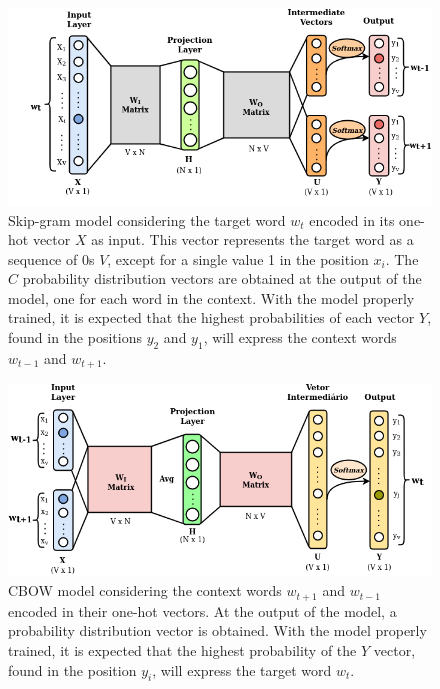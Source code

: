 \documentclass{ieeeaccess}
\begin{document}

\begin{figure}[h]
	\centering
	\includegraphics[width=.8\linewidth]{../minicurso/skipgram.png}
	\caption{Skip-gram model considering the target word $ w_t $ encoded in its one-hot vector $ X $ as input. This vector represents the target word as a  sequence of 0s $ V $, except for a single value 1 in the position $ x_i $.   The $C$ probability distribution vectors are obtained at the output of the model, one for each word in the context. With the model properly trained, it is expected that the highest probabilities of each  vector $ Y $, found in the positions $ y_2 $ and $ y_1 $, will express the context words $ w_ {t-1} $ and $ w_ {t + 1} $.}
	\label{fig:skip-gram}
\end{figure}

\begin{figure}[t]
	\centering
	\includegraphics[width=.8\linewidth]{../minicurso/cbow.png}
	\caption{CBOW model considering the context words $ w_ {t + 1} $ and $ w_ {t-1} $ encoded in their one-hot vectors. At the output of the model, a probability distribution vector is obtained. With the model properly trained, it is expected that the highest probability of the $Y$ vector, found in the position $ y_i $, will express the target word $ w_ {t} $.}
	\label{fig:cbow}
\end{figure}
\end{document}
